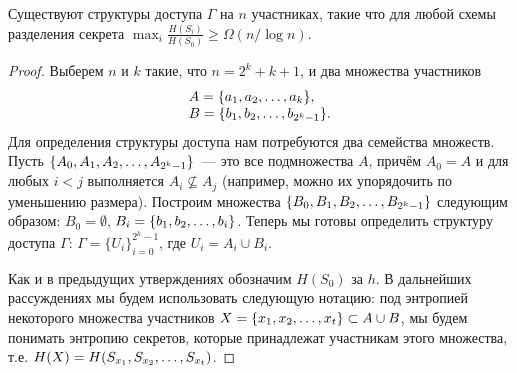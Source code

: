 \documentclass[12pt]{article}
\begin{document}
\begin{theorem}[Csirmaz'94]
    Существуют структуры доступа $\Gamma$ на $n$ участниках, такие что для любой схемы разделения
    секрета $\max_i\frac{H(S_i)}{H(S_0)} \ge \Omega(n/\log n)$.
\end{theorem}
\begin{proof}
    Выберем $n$ и $k$ такие, что $n = 2^k + k + 1$, и два множества участников 
    \[
        \begin{array}{l}
            A = \{{a}_1,{a}_2,\dotsc,{a}_{k}\},\\
            B = \{{b}_1,{b}_2,\dotsc,{b}_{2^k - 1}\}.
        \end{array}
    \]
    Для определения структуры доступа нам потребуются два семейства множеств. 
    Пусть $\{A_0,{A}_1,{A}_2,\dotsc,{A}_{2^k-1}\}$~--- это все подмножества $A$, причём $A_0 = A$ и для любых
    $i < j$ выполняется $A_i\not\subseteq A_j$ (например, можно их упорядочить по уменьшению
    размера). Построим множества $\{B_0,{B}_1,{B}_2,\dotsc,{B}_{2^k - 1}\}$ следующим образом: $B_0 = \emptyset$, 
    $B_i = \{{b}_1,{b}_2,\dotsc,{b}_{i}\}$.  
    Теперь мы готовы определить структуру доступа $\Gamma$: $\Gamma = \{U_i\}_{i=0}^{2^k-1}$, где $U_i =
    A_i\cup B_i$. 
    
    Как и в предыдущих утверждениях обозначим $H(S_0)$ за $h$.
    В дальнейших рассуждениях мы будем использовать следующую нотацию: под энтропией некоторого
    множества участников $X = \{{x}_1,{x}_2,\dotsc,{x}_{t}\}\subset A\cup B$, мы будем понимать энтропию секретов, которые
    принадлежат участникам этого множества, т.е. $H(X) = H({S}_{{x}_1},{S}_{{x}_2},\dotsc,{S}_{{x}_{t}})$.


\end{proof}
\end{document}
